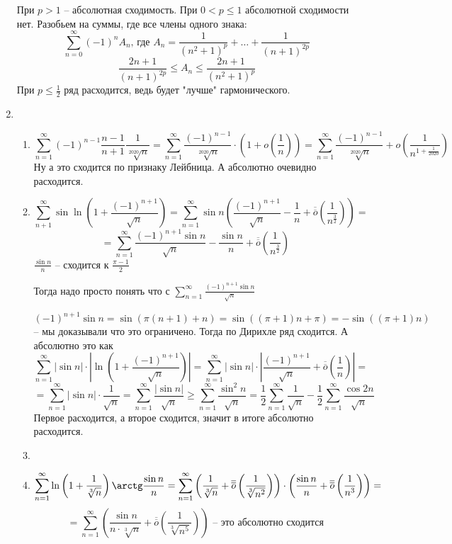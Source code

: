 \documentclass[11pt]{article}
\begin{document}
\begin{enumerate}
		При $p>1$ -- абсолютная сходимость. При $0<p\le 1$ абсолютной сходимости нет. Разобьем на суммы, где все члены одного знака: $$\sum_{n=0}^{\infty} (-1)^n A_n \text{, где } A_n = \frac{1}{(n^2+1)^p} + \dots + \frac{1}{(n+1)^{2p}}$$
		$$\frac{2n+1}{(n+1)^{2p}}\le A_n \le \frac{2n+1}{(n^2+1)^p}$$
		При $p\le \frac{1}{2}$ ряд расходится, ведь будет "лучше" гармонического.
		\item \begin{enumerate}
			\item $$\sum_{n=1}^{\infty} (-1)^{n-1} \frac{n-1}{n+1} \frac{1}{\sqrt[2020]{n}} = \sum_{n=1}^{\infty} \frac{(-1)^{n-1}}{\sqrt[2020]{n}} \cdot \left( 1+o\left(\frac{1}{n}\right)\right) = \sum_{n=1}^{\infty} \frac{(-1)^{n-1}}{\sqrt[2020]{n}} +o\left(\frac{1}{n^{1+\frac{1}{2020}}}\right)$$
			Ну а это сходится по признаку Лейбница. А абсолютно очевидно расходится.
			
			\item $$\sum_{n+1}^{\infty} \sin \ln \left(1 + \frac{(-1)^{n+1}}{\sqrt{n}}\right) = \sum_{n=1}^{\infty} \sin n \left(\frac{(-1)^{n+1}}{\sqrt{n}}-\frac{1}{n}+\overline{\overline{o}}\left(\frac{1}{n^{\frac{3}{2}}}\right)\right)=$$
			$$=\sum_{n=1}^{\infty} \frac{(-1)^{n+1}\sin n}{\sqrt{n}}-\frac{\sin n}{n}+\overline{\overline{o}}\left(\frac{1}{n^{\frac{3}{2}}}\right)$$
			$\frac{\sin n}{n}$ -- сходится к $\frac{\pi -1}{2}$
			
			Тогда надо просто понять что с $\sum_{n=1}^{\infty} \frac{(-1)^{n+1}\sin n}{\sqrt{n}}$
			
			$$(-1)^{n+1}\sin n = \sin (\pi (n+1) + n) = \sin ((\pi +1)n+\pi) = -\sin ((\pi +1)n)$$ -- мы доказывали что это ограничено. Тогда по Дирихле ряд сходится. А абсолютно это как $$\sum_{n=1}^{\infty}|\sin n|\cdot |\ln \left(1+ \frac{(-1)^{n+1}}{\sqrt{n}}\right)|= \sum_{n=1}^{\infty} |\sin n|\cdot |\frac{(-1)^{n+1}}{\sqrt{n}}+ \overline{\overline{o}}\left(\frac{1}{n}\right)| = $$
			$$= \sum_{n=1}^{\infty} |\sin n|\cdot\frac{1}{\sqrt{n}} = \sum_{n=1}^{\infty} \frac{|\sin n|}{\sqrt{n}}\ge \sum_{n=1}^{\infty} \frac{\sin^2 n}{\sqrt{n}} = \frac{1}{2}\sum_{n=1}^{\infty} \frac{1}{\sqrt{n}} - \frac{1}{2}\sum_{n=1}^{\infty} \frac{\cos 2n}{\sqrt{n}}$$
			Первое расходится, а второе сходится, значит в итоге абсолютно расходится.
			\item 
			
			\item $$ \sum_{n=1}^{\infty}\ln \left(1+ \frac{1}{\sqrt[3]{n}} \right)\arctg \frac{\sin n}{n}= \sum_{n=1}^{\infty} \left( \frac{1}{\sqrt[3]{n}} + \overline{\overline{o}}\left(\frac{1}{\sqrt[3]{n^2}}\right) \right)\cdot \left( \frac{\sin n}{n} + \overline{\overline{o}}\left(\frac{1}{n^3}\right)  \right) = $$
			$$= \sum_{n=1}^{\infty} \left(\frac{\sin n }{n\cdot \sqrt[3]{n}}+\overline{\overline{o}}\left(\frac{1}{\sqrt[3]{n^5}}\right)\right)\text{ -- это абсолютно сходится}$$
			
		\end{enumerate}
		
	\end{enumerate}
\end{document}
